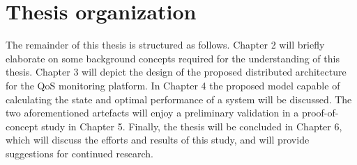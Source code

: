 \section{Thesis organization}
The remainder of this thesis is structured as follows. Chapter 2 will briefly elaborate on some background concepts required for the understanding of this thesis. Chapter 3 will depict the design of the proposed distributed architecture for the QoS monitoring platform. In Chapter 4 the proposed model capable of calculating the state and optimal performance of a system will be discussed. The two aforementioned artefacts will enjoy a preliminary validation in a proof-of-concept study in Chapter 5. Finally, the thesis will be concluded in Chapter 6, which will discuss the efforts and results of this study, and will provide suggestions for continued research.